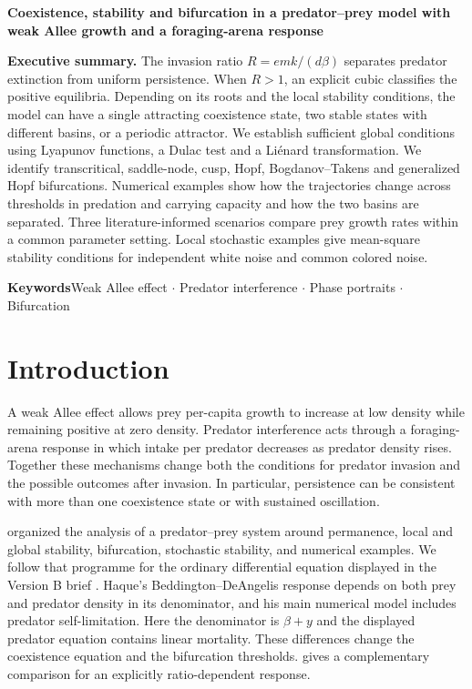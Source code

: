 {\raggedright\noindent\LARGE\bfseries Coexistence, stability and bifurcation in a predator--prey model with weak Allee growth and a foraging-arena response\par}
\vspace{.8em}{\noindent\large Project 3H (Version B)\par}\vspace{1.05em}
\noindent\textbf{Executive summary.}
The invasion ratio \(R=emk/(d\beta)\) separates predator extinction from uniform persistence. When \(R>1\), an explicit cubic classifies the positive equilibria. Depending on its roots and the local stability conditions, the model can have a single attracting coexistence state, two stable states with different basins, or a periodic attractor. We establish sufficient global conditions using Lyapunov functions, a Dulac test and a Li\'enard transformation. We identify transcritical, saddle-node, cusp, Hopf, Bogdanov--Takens and generalized Hopf bifurcations. Numerical examples show how the trajectories change across thresholds in predation and carrying capacity and how the two basins are separated. Three literature-informed scenarios compare prey growth rates within a common parameter setting. Local stochastic examples give mean-square stability conditions for independent white noise and common colored noise.

\medskip\noindent\textbf{Keywords}\quad Weak Allee effect \(\cdot\) Predator interference \(\cdot\) Phase portraits \(\cdot\) Bifurcation
\tableofcontents
\clearpage

\section{Introduction}
A weak Allee effect allows prey per-capita growth to increase at low density while remaining positive at zero density. Predator interference acts through a foraging-arena response in which intake per predator decreases as predator density rises. Together these mechanisms change both the conditions for predator invasion and the possible outcomes after invasion. In particular, persistence can be consistent with more than one coexistence state or with sustained oscillation.

\citet{haque11} organized the analysis of a predator--prey system around permanence, local and global stability, bifurcation, stochastic stability, and numerical examples. We follow that programme for the ordinary differential equation displayed in the Version B brief \citep{brief}. Haque's Beddington--DeAngelis response depends on both prey and predator density in its denominator, and his main numerical model includes predator self-limitation. Here the denominator is \(\beta+y\) and the displayed predator equation contains linear mortality. These differences change the coexistence equation and the bifurcation thresholds. \citet{haque09} gives a complementary comparison for an explicitly ratio-dependent response.

